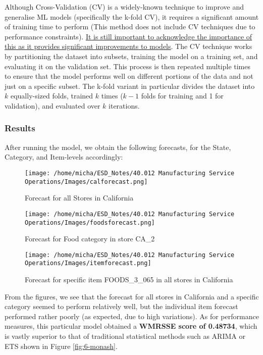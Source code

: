 \documentclass[12pt]{article}
\begin{document}
Although Cross-Validation (CV) is a widely-known technique to improve and generalise ML models (specifically the k-fold CV), it requires a significant amount of training time to perform (This method does not include CV techniques due to performance constraints). \href{https://www.kaggle.com/c/m5-forecasting-accuracy/discussion/166814}{It is still important to acknowledge the importance of this as it provides significant improvements to models}. The CV technique works by partitioning the dataset into subsets, training the model on a training set, and evaluating it on the validation set. This process is then repeated multiple times to ensure that the model performs well on different portions of the data and not just on a specific subset. The k-fold variant in particular divides the dataset into $k$ equally-sized folds, trained $k$ times ($k-1$ folds for training and 1 for validation), and evaluated over $k$ iterations. 

\newpage

\subsubsection*{Results}

After running the model, we obtain the following forecasts, for the State, Category, and Item-levels accordingly:

\begin{figure}[H]
    \centering
    \texttt{[image: /home/micha/ESD\_Notes/40.012 Manufacturing Service Operations/Images/calforecast.png]}
    \caption{Forecast for all Stores in California}
    \label{fig:6-calforecast}
\end{figure} 

\begin{figure}[H]
    \centering
    \texttt{[image: /home/micha/ESD\_Notes/40.012 Manufacturing Service Operations/Images/foodsforecast.png]}
    \caption{Forecast for Food category in store CA\_2}
    \label{fig:6-foodforecast}
\end{figure} 

\begin{figure}[H]
    \centering
    \texttt{[image: /home/micha/ESD\_Notes/40.012 Manufacturing Service Operations/Images/itemforecast.png]}
    \caption{Forecast for specific item FOODS\_3\_065 in all stores in California}
    \label{fig:6-itemforecast}
\end{figure} 

\noindent From the figures, we see that the forecast for all stores in California and a specific category seemed to perform relatively well, but the individual item forecast performed rather poorly (as expected, due to high variations). As for performance measures, this particular model obtained a \textbf{WMRSSE score of 0.48734}, which is vastly superior to that of traditional statistical methods such as ARIMA or ETS shown in Figure \ref{fig:6-monash}. \\ 
\end{document}
